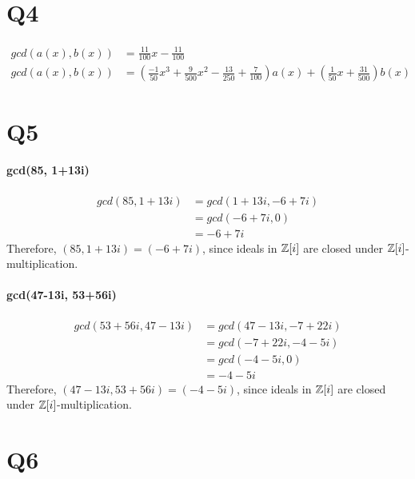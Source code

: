 \documentclass[]{article}
\begin{document}
\section*{Q4}
	\paragraph{}
	\begin{align*}
		gcd(a(x), b(x)) &= \frac{11}{100}x - \frac{11}{100}\\
		gcd(a(x), b(x)) &= (\frac{-1}{50}x^3 + \frac{9}{500}x^2 - \frac{13}{250} + \frac{7}{100}) a(x) + (\frac{1}{50}x + \frac{31}{500}) b(x)
	\end{align*}


\section*{Q5}
	\paragraph{gcd(85, 1+13i)}
	\begin{align*}
	gcd(85, 1+13i) &= gcd(1+13i, -6+7i)\\ &= gcd(-6+7i, 0)\\ &= -6+7i
	\end{align*}
	Therefore, $(85, 1+13i) = (-6+7i)$, since ideals in $\mathbb{Z}[i]$ are closed under $\mathbb{Z}[i]$-multiplication.
	\paragraph{gcd(47-13i, 53+56i)}
	\begin{align*}
	gcd(53+56i, 47-13i) &= gcd(47-13i, -7+22i)\\ &= gcd(-7+22i, -4-5i)\\ &= gcd(-4-5i, 0)\\ &= -4-5i
	\end{align*}
	Therefore, $(47-13i, 53+56i) = (-4-5i)$, since ideals in $\mathbb{Z}[i]$ are closed under $\mathbb{Z}[i]$-multiplication.


\section*{Q6}
\end{document}
